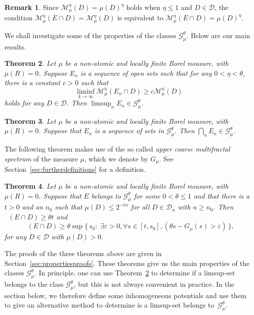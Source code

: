\documentclass[10pt]{amsart}
\newtheorem{theo}{Theorem}[section]
\theoremstyle{definition}\newtheorem{defi}[theo]{Definition}\newtheorem{rema}[theo]{Remark}\newtheorem{exam}[theo]{Example}\newtheorem{exem}[theo]{Example}\newtheorem{nota}[theo]{Notation}
\DeclareMathOperator{\dimh}{dim_H}
\let\oldexists\exists
\renewcommand*{\exists}{\mathrel{\oldexists}}
\let\oldforall\forall
\renewcommand*{\forall}{\mathrel{\oldforall}}
\begin{document}
\begin{rema}
Since $\mathscr{M}_\mu^\eta (D) = \mu (D)^\eta$ holds when $\eta
\leq 1$ and $D \in \mathscr{D}$, the condition $\mathscr{M}_\mu^\eta (E \cap D) = \mathscr{M}_\mu^\eta (D)$ is equivalent to $\mathscr{M}_\mu^\eta (E \cap D) = \mu (D)^\eta$.
\end{rema}

We shall investigate some of the properties of the classes $\mathscr{G}_\mu^\theta$. Below are our main results.

\begin{theo}\label{the:limsup}
Let $\mu$ be a non-atomic and locally finite Borel measure, with $\mu (R) = 0$. Suppose $E_n$ is a sequence of open sets such that for any $0 < \eta < \theta$, there is a constant $c > 0$ such that
\[
\liminf_{k\to\infty} \mathscr{M}_\mu^\eta (E_n \cap D) \geq c
\mathscr{M}_\mu^\eta (D)
\]
holds for any $D \in \mathscr{D}$. Then $\limsup_n E_n \in
\mathscr{G}_\mu^\theta$.
\end{theo}

\begin{theo}\label{the:intersection}
Let $\mu$ be a non-atomic and locally finite Borel measure, with $\mu (R) = 0$. Suppose that $E_n$ is a sequence of sets in $\mathscr{G}_\mu^\theta$. Then $\bigcap_n E_n \in
\mathscr{G}_\mu^\theta$.
\end{theo}

The following theorem makes use of the so called \emph{upper coarse multifractal spectrum} of the measure $\mu$, which we denote by $G_\mu$. See Section~\ref{sec:furtherdefinitions} for a definition.

\begin{theo}\label{the:dimension}
Let $\mu$ be a non-atomic and locally finite Borel measure, with $\mu (R) = 0$. Suppose that $E$ belongs to $\mathscr{G}_\mu^\theta$ for some $0 < \theta \leq 1$ and that there is a $t > 0$ and an $n_0$ such that $\mu (D) \leq 2^{-tn}$ for all $D \in \mathscr{D}_n$ with $n \geq n_0$. Then $\dimh (E \cap D) \geq \theta t$ and
\[
\dimh (E \cap D) \geq \theta \sup \{\, s_0 :\; \exists \varepsilon > 0, \forall s\in [t,s_0], (\theta s - G_\mu (s) > \varepsilon) \,\},
\]
for any $D \in \mathscr{D}$ with $\mu (D) > 0$.
\end{theo}

The proofs of the three theorems above are given in Section~\ref{sec:propertiesproofs}. These theorems give us the main properties of the classes $\mathscr{G}_\mu^\theta$. In principle, one can use Theorem~\ref{the:limsup} to determine if a limsup-set belongs to the class $\mathscr{G}_\mu^\theta$, but this is not always convenient in practice. In the section below, we therefore define some inhomogeneous potentials and use them to give an alternative method to determine is a limsup-set belongs to~$\mathscr{G}_\mu^\theta$.
\end{document}
